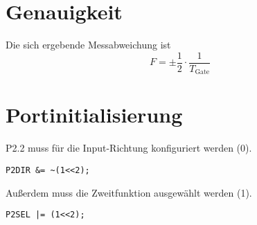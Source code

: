 \documentclass[a4paper, 12pt]{article}
\begin{document}
\section{Genauigkeit}
Die sich ergebende Messabweichung ist
\[F = \pm \frac{1}{2} \cdot \frac{1}{T_{\textrm{Gate}}}\]

\section{Portinitialisierung}
P2.2 muss für die Input-Richtung konfiguriert werden (0).
\begin{lstlisting}
P2DIR &= ~(1<<2);
\end{lstlisting}

\noindent Außerdem muss die Zweitfunktion ausgewählt werden (1).
\begin{lstlisting}
P2SEL |= (1<<2);
\end{lstlisting}
\end{document}
